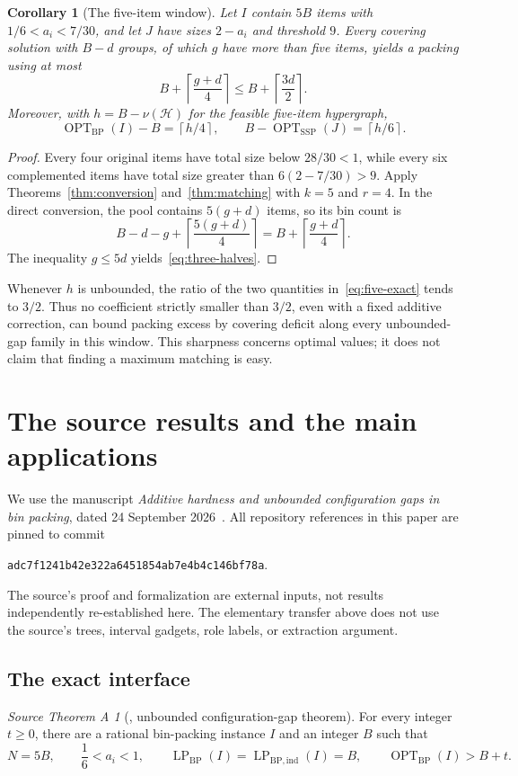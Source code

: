 \documentclass[11pt,a4paper]{article}
\newtheorem{corollary}[theorem]{Corollary}
\theoremstyle{definition}
\theoremstyle{remark}
\newtheorem*{sourcegap}{Source Theorem A}
\newcommand{\BP}{\mathrm{BP}}
\newcommand{\SSP}{\mathrm{SSP}}
\newcommand{\OPT}{\operatorname{OPT}}
\newcommand{\LP}{\operatorname{LP}}
\newcommand{\ceil}[1]{\left\lceil #1\right\rceil}
\newcommand{\cH}{\mathcal H}
\newcommand{\sourcecommit}{\texttt{adc7f1241b42e322a6451854ab7e4b4c146bf78a}}
\begin{document}
\begin{corollary}[The five-item window]\label{cor:five}
Let $I$ contain $5B$ items with $1/6<a_i<7/30$, and let $J$ have sizes $2-a_i$ and threshold $9$. Every covering solution with $B-d$ groups, of which $g$ have more than five items, yields a packing using at most
\begin{equation}\label{eq:three-halves}
 B+\ceil{\frac{g+d}{4}}
 \le B+\ceil{\frac{3d}{2}}.
\end{equation}
Moreover, with $h=B-\nu(\cH)$ for the feasible five-item hypergraph,
\begin{equation}\label{eq:five-exact}
 \OPT_{\BP}(I)-B=\ceil{h/4},
 \qquad B-\OPT_{\SSP}(J)=\ceil{h/6}.
\end{equation}
\end{corollary}
\begin{proof}
Every four original items have total size below $28/30<1$, while every six complemented items have total size greater than $6(2-7/30)>9$. Apply Theorems~\ref{thm:conversion} and~\ref{thm:matching} with $k=5$ and $r=4$. In the direct conversion, the pool contains $5(g+d)$ items, so its bin count is
\[
 B-d-g+\ceil{\frac{5(g+d)}4}=B+\ceil{\frac{g+d}4}.
\]
The inequality $g\le5d$ yields~\eqref{eq:three-halves}.
\end{proof}
Whenever $h$ is unbounded, the ratio of the two quantities in~\eqref{eq:five-exact} tends to $3/2$. Thus no coefficient strictly smaller than $3/2$, even with a fixed additive correction, can bound packing excess by covering deficit along every unbounded-gap family in this window. This sharpness concerns optimal values; it does not claim that finding a maximum matching is easy.

\section{The source results and the main applications}\label{sec:source}
We use the manuscript \emph{Additive hardness and unbounded configuration gaps in bin packing}, dated 24 September 2026~\cite{OAI26}. All repository references in this paper are pinned to commit
\begin{center}\sourcecommit.\end{center}
The source's proof and formalization are external inputs, not results independently re-established here. The elementary transfer above does not use the source's trees, interval gadgets, role labels, or extraction argument.

\subsection{The exact interface}
\begin{sourcegap}[\cite{OAI26}, unbounded configuration-gap theorem]
For every integer $t\ge0$, there are a rational bin-packing instance $I$ and an integer $B$ such that
\begin{equation}\label{eq:source-gap}
 N=5B,\qquad \frac16<a_i<1,\qquad
 \LP_{\BP}(I)=\LP_{\BP,\mathrm{ind}}(I)=B,
 \qquad \OPT_{\BP}(I)>B+t.
\end{equation}
\end{sourcegap}
\end{document}
